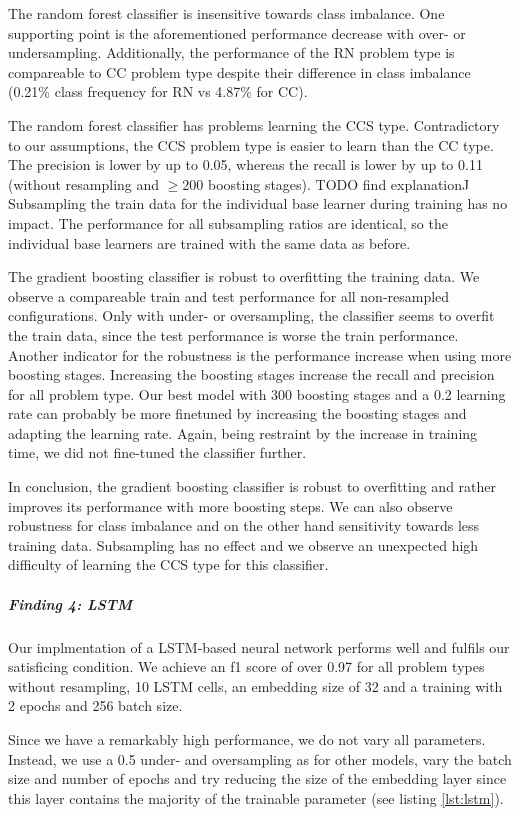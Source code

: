 The random forest classifier is insensitive towards class imbalance. One supporting point is the aforementioned performance decrease with over- or undersampling. Additionally, the performance of the RN problem type is compareable to CC problem type despite their difference in class imbalance (0.21\% class frequency for RN vs 4.87\% for CC). 

The random forest classifier has problems learning the CCS type. Contradictory to our assumptions, the CCS problem type is easier to learn than the CC type. The precision is lower by up to 0.05, whereas the recall is lower by up to 0.11 (without resampling and $\geq 200$ boosting stages). TODO find explanation^^

Subsampling the train data for the individual base learner during training has no impact. The performance for all subsampling ratios are identical, so the individual base learners are trained with the same data as before.

The gradient boosting classifier is robust to overfitting the training data. We observe a compareable train and test performance for all non-resampled configurations. Only with under- or oversampling, the classifier seems to overfit the train data, since the test performance is worse the train performance. 
Another indicator for the robustness is the performance increase when using more boosting stages. Increasing the boosting stages increase the recall and precision for all problem type. Our best model with 300 boosting stages and a 0.2 learning rate can probably be more finetuned by increasing the boosting stages and adapting the learning rate. Again, being restraint by the increase in training time, we did not fine-tuned the classifier further.

In conclusion, the gradient boosting classifier is robust to overfitting and rather improves its performance with more boosting steps. We can also observe robustness for class imbalance and on the other hand sensitivity towards less training data. Subsampling has no effect and we observe an unexpected high difficulty of learning the CCS type for this classifier.


\subparagraph{Finding 4: LSTM}
Our implmentation of a LSTM-based neural network performs well and fulfils our satisficing condition. We achieve an f1 score of over 0.97 for all problem types without resampling, 10 LSTM cells, an embedding size of 32 and a training with 2 epochs and 256 batch size. 


Since we have a remarkably high performance, we do not vary all parameters. Instead, we use a 0.5 under- and oversampling as for other models, vary the batch size and number of epochs and try reducing the size of the embedding layer since this layer contains the majority of the trainable parameter (see listing \ref{lst:lstm}).


